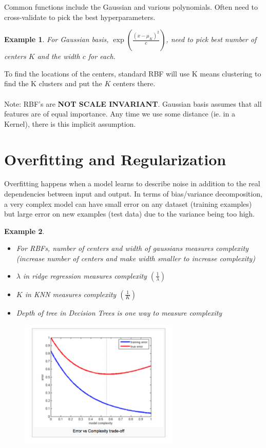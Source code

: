 \documentclass[a4paper]{article}\usepackage[]{graphicx}\usepackage[]{color}
\newtheorem{ex}{Example}[section]
\begin{document}
Common functions include the Gaussian and various polynomials. Often need to cross-validate to pick the best hyperparameters. 

\begin{ex}
For Gaussian basis, $\exp\left(\frac{(x-\mu_K)^2}{c}\right)$, need to pick best number of centers $K$ and the width $c$ for each.
\end{ex} 

To find the locations of the centers, standard RBF will use K means clustering to find the K clusters and put the $K$ centers there.  \\
\\
Note: RBF's are \textbf{NOT SCALE INVARIANT}. Gaussian basis assumes that all features are of equal importance. Any time we use some distance (ie. in a Kernel), there is this implicit assumption. 


\section{Overfitting and Regularization}

Overfitting happens when a model learns to describe noise in addition to the real dependencies between input and output. In terms of bias/variance decomposition, a very complex model can have small error on any dataset (training examples) but large error on new examples (test data) due to the variance being too high. 

\begin{ex}
\begin{itemize}
\item For RBFs, number of centers and width of gaussians measures complexity (increase number of centers and make width smaller to increase complexity)
\item $\lambda$ in ridge regression measures complexity $\left(\frac{1}{\lambda}\right)$
\item $K$ in KNN measures complexity $\left(\frac{1}{K}\right)$
\item Depth of tree in Decision Trees is one way to measure complexity 
\end{itemize}
\end{ex}

\begin{figure}[H]
\centering
\includegraphics[width=3in]{overfit.png}
\end{figure}
\end{document}
